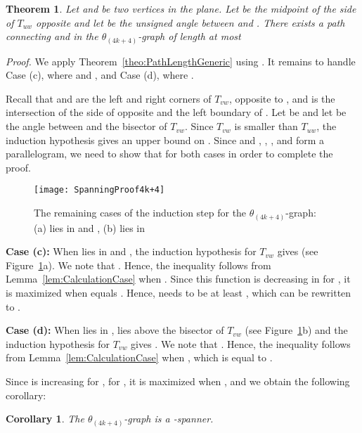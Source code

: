 \documentclass[12pt]{article}
\newtheorem{theo}[defin]{Theorem}
\newenvironment{theorem}{\begin{theo} \sl}{\end{theo}}
\newtheorem{coro}[defin]{Corollary}
\newenvironment{corollary}{\begin{coro} \sl}{\end{coro}}
\newenvironment{proof}{\emph{Proof.}}{\hfill \\}
\newcommand{\graph}[1]{\ensuremath{\theta_{(4 k + #1)}}-graph\xspace}
\newcommand{\canon}[2]{\ensuremath{T_{#1 #2}}}
\begin{document}
\begin{theorem}
  \label{theo:PathLength4k+4}
  Let  and  be two vertices in the plane. Let  be the midpoint of the side of \canon{u}{w} opposite  and let  be the unsigned angle between  and . There exists a path connecting  and  in the \graph{4} of length at most 
   
\end{theorem}
\begin{proof}
  We apply Theorem~\ref{theo:PathLengthGeneric} using . It remains to handle Case (c), where  and , and Case (d), where . 

  Recall that  and  are the left and right corners of \canon{v}{w}, opposite to , and  is the intersection of the side of  opposite  and the left boundary of . Let  be  and let  be the angle between  and the bisector of \canon{v}{w}. Since \canon{v}{w} is smaller than \canon{u}{w}, the induction hypothesis gives an upper bound on . Since  and , , , and  form a parallelogram, we need to show that  for both cases in order to complete the proof. 

  \begin{figure}[ht]
    \begin{center}
      \texttt{[image: SpanningProof4k+4]}
    \end{center}
    \caption{The remaining cases of the induction step for the \graph{4}: (a)  lies in  and , (b)  lies in }
    \label{fig:SpanningProof4k+4}
  \end{figure}

  \textbf{Case (c):} When  lies in  and , the induction hypothesis for \canon{v}{w} gives  (see Figure~\ref{fig:SpanningProof4k+4}a). We note that . Hence, the inequality follows from Lemma~\ref{lem:CalculationCase} when . Since this function is decreasing in  for , it is maximized when  equals . Hence,  needs to be at least , which can be rewritten to . 

  \textbf{Case (d):} When  lies in ,  lies above the bisector of \canon{v}{w} (see Figure~\ref{fig:SpanningProof4k+4}b) and the induction hypothesis for \canon{v}{w} gives . We note that . Hence, the inequality follows from Lemma~\ref{lem:CalculationCase} when , which is equal to . 
\end{proof}

Since  is increasing for , for , it is maximized when , and we obtain the following corollary: 

\begin{corollary}
  \label{cor:SpanningRatio4k+4}
  The \graph{4} is a -spanner. 
\end{corollary}
\end{document}
